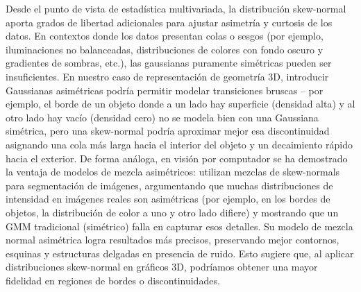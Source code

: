 Desde el punto de vista de estadística multivariada, la distribución skew-normal aporta grados de libertad adicionales para ajustar asimetría 
y curtosis de los datos. En contextos donde los datos presentan colas o sesgos (por ejemplo, iluminaciones no balanceadas, 
distribuciones de colores con fondo oscuro y gradientes de sombras, etc.), las gaussianas puramente simétricas pueden ser insuficientes. 
En nuestro caso de representación de geometría 3D, introducir Gaussianas asimétricas podría permitir modelar transiciones bruscas – por ejemplo, 
el borde de un objeto donde a un lado hay superficie (densidad alta) y al otro lado hay vacío (densidad cero) no se modela bien con 
una Gaussiana simétrica, pero una skew-normal podría aproximar mejor esa discontinuidad asignando una cola más larga hacia el interior 
del objeto y un decaimiento rápido hacia el exterior. De forma análoga, en visión por computador se ha demostrado la ventaja de modelos 
de mezcla asimétricos: \cite{2021_Chen} utilizan mezclas de skew-normals para segmentación de imágenes, argumentando que muchas 
distribuciones de intensidad en imágenes reales son asimétricas (por ejemplo, en los bordes de objetos, la distribución de color a uno y 
otro lado difiere) y mostrando que un GMM tradicional (simétrico) falla en capturar esos detalles. Su modelo de mezcla normal asimétrica logra 
resultados más precisos, preservando mejor contornos, esquinas y estructuras delgadas en presencia de ruido. Esto sugiere que, al aplicar 
distribuciones skew-normal en gráficos 3D, podríamos obtener una mayor fidelidad en regiones de bordes o discontinuidades. 

